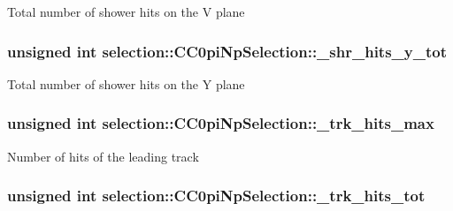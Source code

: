 Total number of shower hits on the V plane \hypertarget{classselection_1_1CC0piNpSelection_a6a43c3523af47860ad1682ebe14bb8e3}{
\subsubsection[{\-\_\-shr\-\_\-hits\-\_\-y\-\_\-tot}]{\setlength{\rightskip}{0pt plus 5cm}unsigned int selection\-::\-C\-C0pi\-Np\-Selection\-::\-\_\-shr\-\_\-hits\-\_\-y\-\_\-tot\hspace{0.3cm}{\ttfamily [private]}}}\label{classselection_1_1CC0piNpSelection_a6a43c3523af47860ad1682ebe14bb8e3}
Total number of shower hits on the Y plane \hypertarget{classselection_1_1CC0piNpSelection_a247d186cb641d28f8ea5b02c4f2a39bc}{
\subsubsection[{\-\_\-trk\-\_\-hits\-\_\-max}]{\setlength{\rightskip}{0pt plus 5cm}unsigned int selection\-::\-C\-C0pi\-Np\-Selection\-::\-\_\-trk\-\_\-hits\-\_\-max\hspace{0.3cm}{\ttfamily [private]}}}\label{classselection_1_1CC0piNpSelection_a247d186cb641d28f8ea5b02c4f2a39bc}
Number of hits of the leading track \hypertarget{classselection_1_1CC0piNpSelection_a420b9962478d7998282e03f1ccf89c2e}{
\subsubsection[{\-\_\-trk\-\_\-hits\-\_\-tot}]{\setlength{\rightskip}{0pt plus 5cm}unsigned int selection\-::\-C\-C0pi\-Np\-Selection\-::\-\_\-trk\-\_\-hits\-\_\-tot\hspace{0.3cm}{\ttfamily [private]}}}\label{classselection_1_1CC0piNpSelection_a420b9962478d7998282e03f1ccf89c2e}
